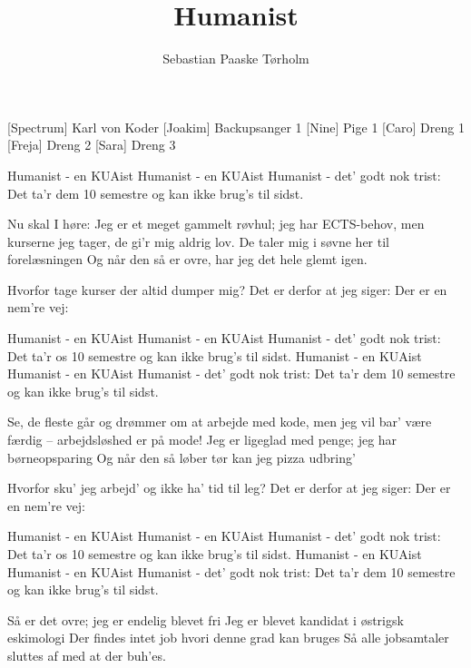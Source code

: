 \documentclass[a4paper,11pt]{article}
\title{Humanist}
\author{Sebastian Paaske Tørholm}
\begin{document}
\maketitle

\begin{roles}
[Spectrum] Karl von Koder
[Joakim] Backupsanger 1
[Nine] Pige 1
[Caro] Dreng 1
[Freja] Dreng 2
[Sara] Dreng 3
\end{roles}

\begin{song}
     {
        Humanist - en KUAist
        Humanist - en KUAist
        Humanist - det’ godt nok trist:
        Det ta’r dem 10 semestre
        og kan ikke brug’s til sidst.
    }
%
     {
        Nu skal I høre:
        Jeg er et meget gammelt røvhul; jeg har ECTS-behov,
        men kurserne jeg tager, de gi’r mig aldrig lov.
        De taler mig i søvne her til forelæsningen
        Og når den så er ovre, har jeg det hele glemt igen.

        Hvorfor tage kurser der altid dumper mig?
        Det er derfor at jeg siger: Der er en nem're vej:
    }
     {
        Humanist - en KUAist
        Humanist - en KUAist
        Humanist - det’ godt nok trist:
        Det ta’r os 10 semestre
        og kan ikke brug’s til sidst.
    }
     {
        Humanist - en KUAist
        Humanist - en KUAist
        Humanist - det’ godt nok trist:
        Det ta’r dem 10 semestre
        og kan ikke brug’s til sidst.
    }
%
     {
        Se, de fleste går og drømmer om at arbejde med kode,
        men jeg vil bar’ være færdig -- arbejdsløshed er på mode!
        Jeg er ligeglad med penge; jeg har børneopsparing
        Og når den så løber tør kan jeg pizza udbring’

        Hvorfor sku' jeg arbejd’ og ikke ha’ tid til leg?
        Det er derfor at jeg siger: Der er en nem're vej:
    }
     {
        Humanist - en KUAist
        Humanist - en KUAist
        Humanist - det’ godt nok trist:
        Det ta’r os 10 semestre
        og kan ikke brug’s til sidst.
    }
     {
        Humanist - en KUAist
        Humanist - en KUAist
        Humanist - det’ godt nok trist:
        Det ta’r dem 10 semestre
        og kan ikke brug’s til sidst.
    }
%
     {
        Så er det ovre; jeg er endelig blevet fri
        Jeg er blevet kandidat i østrigsk eskimologi
        Der findes intet job hvori denne grad kan bruges
        Så alle jobsamtaler sluttes af med at der buh’es.

}
\end{song}
\end{document}
